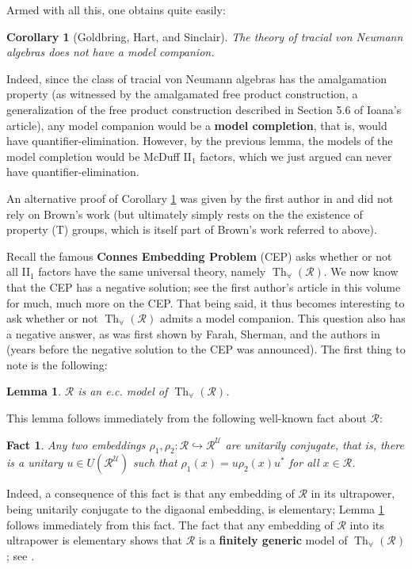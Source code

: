 \documentclass[12pt]{amsart}
\newtheorem{lem}[thm]{Lemma}
\newtheorem{fact}[thm]{Fact}
\newtheorem{cor}[thm]{Corollary}
\theoremstyle{definition}
\def\u{\mathsf 1}
\def \Th{\operatorname{Th}}
\def \R{\mathcal R}
\def \u{\mathcal U}
\begin{document}
Armed with all this, one obtains quite easily:

\begin{cor}[Goldbring, Hart, and Sinclair]\label{nomodelcompanion}
The theory of tracial von Neumann algebras does not have a model companion.
\end{cor}

Indeed, since the class of tracial von Neumann algebras has the amalgamation property (as witnessed by the amalgamated free product construction, a generalization of the free product construction described in Section 5.6 of Ioana's article), any model companion would be a \textbf{model completion}, that is, would have quantifier-elimination.  However, by the previous lemma, the models of the model completion would be McDuff II$_1$ factors, which we just argued can never have quantifier-elimination.

An alternative proof of Corollary \ref{nomodelcompanion} was given by the first author in \cite[Corollary 5.19]{spgap} and did not rely on Brown's work (but ultimately simply rests on the the existence of property (T) groups, which is itself part of Brown's work referred to above).

Recall the famous \textbf{Connes Embedding Problem } (CEP) asks whether or not all II$_1$ factors have the same universal theory, namely $\Th_\forall(\R)$.  We now know that the CEP has a negative solution; see the first author's article in this volume for much, much more on the CEP.  That being said, it thus becomes interesting to ask whether or not $\Th_\forall(\R)$ admits a model companion.  This question also has a negative answer, as was first shown by Farah, Sherman, and the authors in \cite{ecfactors} (years before the negative solution to the CEP was announced).   The first thing to note is the following:

\begin{lem}\label{Rec}
$\R$ is an e.c. model of $\Th_\forall(\R)$.
\end{lem}

This lemma follows immediately from the following well-known fact about $\R$:

\begin{fact}\label{folklore}
Any two embeddings $\rho_1,\rho_2:\R\hookrightarrow \R^\u$ are \emph{unitarily conjugate}, that is, there is a unitary $u\in U(\R^\u)$ such that $\rho_1(x)=u\rho_2(x)u^*$ for all $x\in \R$.
\end{fact}

Indeed, a consequence of this fact is that any embedding of $\R$ in its ultrapower, being unitarily conjugate to the digaonal embedding, is elementary; Lemma \ref{Rec} follows immediately from this fact.  The fact that any embedding of $\R$ into its ultrapower is elementary shows that $\R$ is a \textbf{finitely generic} model of $\Th_\forall(\R)$; see \cite{enforceable}.
\end{document}
